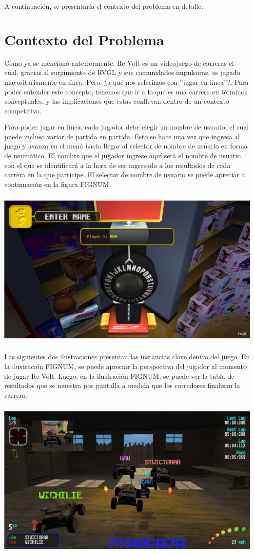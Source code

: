 A continuación, se presentaría el contexto del problema en detalle.

\section{Contexto del Problema}
Como ya se mencionó anteriormente, Re-Volt es un videojuego de carreras el cual, gracias al surgimiento de RVGL y sus comunidades impulsoras, es jugado mayoritariamente en línea. Pero, ¿a qué nos referimos con ''jugar en línea''?. Para poder entender este concepto, tenemos que ir a lo que es una carrera en términos conceptuales, y las implicaciones que estas conllevan dentro de un contexto competitivo.

Para poder jugar en línea, cada jugador debe elegir un nombre de usuario, el cual puede incluso variar de partida en partida. Esto se hace una vez que ingresa al juego y avanza en el menú hasta llegar al selector de nombre de usuario en forma de neumático. El nombre que el jugador ingrese aquí será el nombre de usuario con el que se identificará a la hora de ser ingresado a los resultados de cada carrera en la que participe. El selector de nombre de usuario se puede apreciar a continuación en la figura FIGNUM.

\includegraphics[width=15cm, height=8cm]{img/username.png}

Las siguientes dos ilustraciones presentan las instancias clave dentro del juego. En la ilustración FIGNUM, se puede apreciar la perspectiva del jugador al momento de jugar Re-Volt. Luego, en la ilustración FIGNUM, se puede ver la tabla de resultados que se muestra por pantalla a medida que los corredores finalizan la carrera.

\includegraphics[width=15cm, height=8cm]{img/gameplay.jpg}

